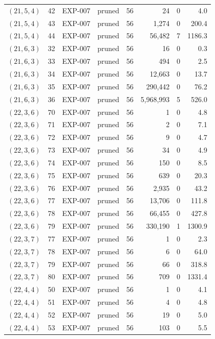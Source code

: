 \begin{longtable}{lrllrrrr}
$(21,5,4)$ & 42 & EXP-007 & pruned & 56 & 24 & 0 & 4.0 \\
$(21,5,4)$ & 43 & EXP-007 & pruned & 56 & 1{,}274 & 0 & 200.4 \\
$(21,5,4)$ & 44 & EXP-007 & pruned & 56 & 56{,}482 & 7 & 1186.3 \\
$(21,6,3)$ & 32 & EXP-007 & pruned & 56 & 16 & 0 & 0.3 \\
$(21,6,3)$ & 33 & EXP-007 & pruned & 56 & 494 & 0 & 2.5 \\
$(21,6,3)$ & 34 & EXP-007 & pruned & 56 & 12{,}663 & 0 & 13.7 \\
$(21,6,3)$ & 35 & EXP-007 & pruned & 56 & 290{,}442 & 0 & 76.2 \\
$(21,6,3)$ & 36 & EXP-007 & pruned & 56 & 5{,}968{,}993 & 5 & 526.0 \\
$(22,3,6)$ & 70 & EXP-007 & pruned & 56 & 1 & 0 & 4.8 \\
$(22,3,6)$ & 71 & EXP-007 & pruned & 56 & 2 & 0 & 7.1 \\
$(22,3,6)$ & 72 & EXP-007 & pruned & 56 & 9 & 0 & 4.7 \\
$(22,3,6)$ & 73 & EXP-007 & pruned & 56 & 34 & 0 & 4.9 \\
$(22,3,6)$ & 74 & EXP-007 & pruned & 56 & 150 & 0 & 8.5 \\
$(22,3,6)$ & 75 & EXP-007 & pruned & 56 & 639 & 0 & 20.3 \\
$(22,3,6)$ & 76 & EXP-007 & pruned & 56 & 2{,}935 & 0 & 43.2 \\
$(22,3,6)$ & 77 & EXP-007 & pruned & 56 & 13{,}706 & 0 & 111.8 \\
$(22,3,6)$ & 78 & EXP-007 & pruned & 56 & 66{,}455 & 0 & 427.8 \\
$(22,3,6)$ & 79 & EXP-007 & pruned & 56 & 330{,}190 & 1 & 1300.9 \\
$(22,3,7)$ & 77 & EXP-007 & pruned & 56 & 1 & 0 & 2.3 \\
$(22,3,7)$ & 78 & EXP-007 & pruned & 56 & 6 & 0 & 64.0 \\
$(22,3,7)$ & 79 & EXP-007 & pruned & 56 & 66 & 0 & 318.8 \\
$(22,3,7)$ & 80 & EXP-007 & pruned & 56 & 709 & 0 & 1331.4 \\
$(22,4,4)$ & 50 & EXP-007 & pruned & 56 & 1 & 0 & 4.1 \\
$(22,4,4)$ & 51 & EXP-007 & pruned & 56 & 4 & 0 & 4.8 \\
$(22,4,4)$ & 52 & EXP-007 & pruned & 56 & 19 & 0 & 5.0 \\
$(22,4,4)$ & 53 & EXP-007 & pruned & 56 & 103 & 0 & 5.5 \\

\end{longtable}
